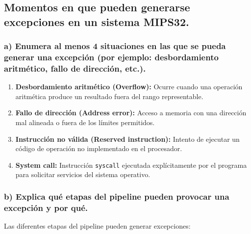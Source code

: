 \documentclass[12pt]{article}
\begin{document}
\subsection{Momentos en que pueden generarse excepciones en un sistema MIPS32.}

\subsubsection{a) Enumera al menos 4 situaciones en las que se pueda generar una excepción (por ejemplo: desbordamiento aritmético, fallo de dirección, etc.).}

\begin{enumerate}
	\item \textbf{Desbordamiento aritmético (Overflow):} Ocurre cuando una operación aritmética produce un resultado fuera del rango representable.
	
	\item \textbf{Fallo de dirección (Address error):} Acceso a memoria con una dirección mal alineada o fuera de los límites permitidos.
	
	\item \textbf{Instrucción no válida (Reserved instruction):} Intento de ejecutar un código de operación no implementado en el procesador.
	
	\item \textbf{System call:} Instrucción \texttt{syscall} ejecutada explícitamente por el programa para solicitar servicios del sistema operativo.
	
\end{enumerate}

\subsubsection{b) Explica qué etapas del pipeline pueden provocar una excepción y por qué.}

Las diferentes etapas del pipeline pueden generar excepciones:
\end{document}
